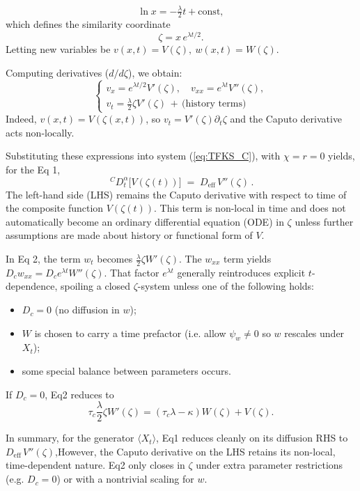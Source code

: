 \documentclass{article}
\begin{document}
\begin{description}
\begin{itemize}
\begin{equation*}
\ln x = -\tfrac{\lambda}{2} t + \mathrm{const} ,
\end{equation*}
which defines the similarity coordinate
\begin{equation*}
\zeta = x\,e^{\lambda t/2}.
\end{equation*}
Letting new variables be $v(x,t)=V(\zeta),\ w(x,t)=W(\zeta)$.
\par
Computing derivatives ($d/d\zeta$), we obtain:
\begin{equation}\label{eq:reduced_III_B}
\begin{cases}
v_x = e^{\lambda t/2} V'(\zeta),\quad v_{xx}=e^{\lambda t} V''(\zeta),\\
v_t = \tfrac{\lambda}{2}\zeta V'(\zeta)\, +\, {\text{(history terms)}}
\end{cases}
\end{equation}
Indeed, $v(x,t)=V(\zeta(x,t))$, so $v_t=V'(\zeta)\partial_t\zeta$ and the Caputo derivative acts non-locally.
\par 
Substituting these expressions into system (\ref{eq:TFKS_C}), with $\chi=r=0$ yields, for the Eq 1,
\begin{equation*}\label{eq:reduced_III_B2}
\,{}^{C}D_t^{\alpha}\big[V(\zeta(t))\big] \;=\; D_{\mathrm{eff}}\,V''(\zeta)\,.
\end{equation*}
The left-hand side (LHS) remains the Caputo derivative with respect to time of the composite function $V(\zeta(t))$. This term is non-local in time and does not automatically become an ordinary differential equation (ODE) in $\zeta$ unless further assumptions are made about history or functional form of $V$.
\par 
In Eq 2, the term $w_t$ becomes $\tfrac{\lambda}{2}\zeta W'(\zeta)$. The $w_{xx}$ term yields $D_c w_{xx}=D_c e^{\lambda t} W''(\zeta)$. That factor $e^{\lambda t}$ generally reintroduces explicit $t$-dependence, spoiling a closed $\zeta$-system unless one of the following holds:
\begin{itemize}
\item[$\bullet$]
 $D_c=0$ (no diffusion in $w$); 
\item[$\bullet$]
$W$ is chosen to carry a time prefactor (i.e. allow $\psi_w\neq0$ so $w$ rescales under $X_t$); 
\item[$\bullet$] 
some special balance between parameters occurs.
\end{itemize}
If $D_c=0$, Eq2 reduces to
\begin{equation*}
\tau_c \frac{\lambda}{2}\zeta W'(\zeta) = (\tau_c\lambda-\kappa)W(\zeta) + V(\zeta).
\end{equation*}
\par 
In summary, for the generator  $\langle X_t\rangle$, Eq1 reduces cleanly on its diffusion RHS to $D_{\mathrm{eff}}\, V''(\zeta)$,However, the Caputo derivative on the LHS retains its non-local, time-dependent nature. Eq2 only closes in $\zeta$ under extra parameter restrictions (e.g. $D_c=0$) or with a nontrivial scaling for $w$.
\end{itemize}
\end{description}
\end{document}
